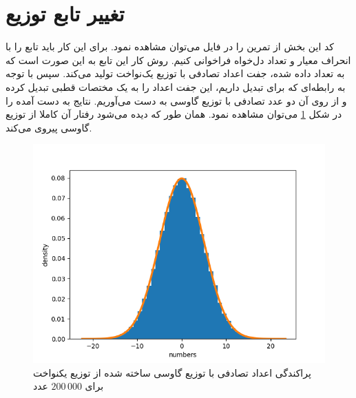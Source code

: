 \documentclass[11pt, a4paper]{article}
\begin{document}
\section{\textbf{تغییر تابع توزیع}}
کد این بخش از تمرین را در فایل
می‌توان مشاهده نمود.
برای این کار باید تابع
را با انحراف معیار و تعداد دل‌خواه فراخوانی کنیم.
روش کار این تابع به این صورت است که به تعداد داده شده، جفت اعداد تصادفی با توزیع یک‌نواخت تولید می‌کند.
سپس با توجه به رابطه‌ای که برای تبدیل داریم،
این جفت اعداد را به یک مختصات قطبی تبدیل کرده و از روی آن دو عدد تصادفی با توزیع گاوسی به دست می‌آوریم.
نتایج به دست آمده را در شکل‌
\ref{fig:q4}
می‌توان مشاهده نمود.
همان طور که دیده می‌شود رفتار آن کاملا از توزیع گاوسی پیروی می‌کند.

\begin{figure}[h]
  \centering
  \includegraphics[width=.7\textwidth]{q4_5_100000.png}
  \caption{پراکندگی اعداد تصادفی با توزیع گاوسی ساخته شده از توزیع یکنواخت برای $200\,000$ عدد}
  \label{fig:q4}
\end{figure}
\end{document}
